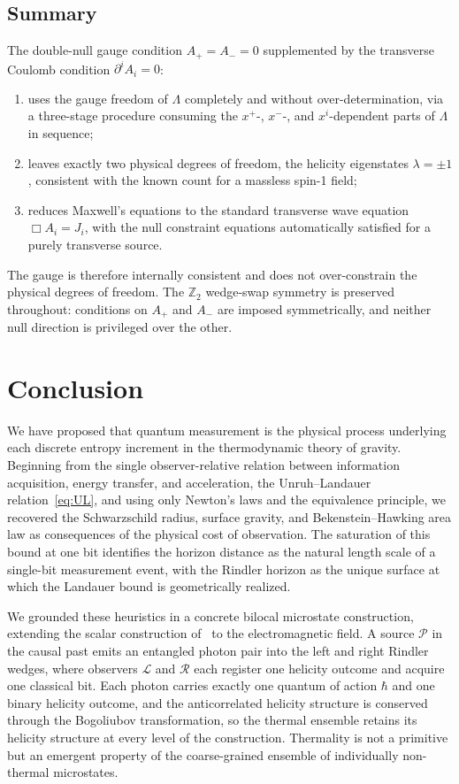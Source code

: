 \documentclass[12pt,a4paper]{article}
\begin{document}
\subsection{Summary}

The double-null gauge condition $A_+ = A_- = 0$ supplemented by the transverse 
Coulomb condition $\partial^i A_i = 0$:
\begin{enumerate}
    \item uses the gauge freedom of $\Lambda$ completely and without over-determination,
          via a three-stage procedure consuming the $x^+$-, $x^-$-, and $x^i$-dependent
          parts of $\Lambda$ in sequence;
    \item leaves exactly two physical degrees of freedom, the helicity eigenstates
          $\lambda = \pm 1$, consistent with the known count for a massless spin-1 field;
    \item reduces Maxwell's equations to the standard transverse wave equation
          $\Box A_i = J_i$, with the null constraint equations automatically satisfied
          for a purely transverse source.
\end{enumerate}
The gauge is therefore internally consistent and does not over-constrain the physical 
degrees of freedom. The $\mathbb{Z}_2$ wedge-swap symmetry is preserved throughout: 
conditions on $A_+$ and $A_-$ are imposed symmetrically, and neither null direction 
is privileged over the other.

\section{Conclusion}

We have proposed that quantum measurement is the physical process 
underlying each discrete entropy increment in the thermodynamic 
theory of gravity. Beginning from the single observer-relative 
relation between information acquisition, energy transfer, and 
acceleration, the Unruh--Landauer relation~\eqref{eq:UL}, 
and using only Newton's laws and the equivalence principle, we 
recovered the Schwarzschild radius, surface gravity, and 
Bekenstein--Hawking area law as consequences of the physical cost 
of observation. The saturation of this bound at one bit identifies 
the horizon distance as the natural length scale of a single-bit 
measurement event, with the Rindler horizon as the unique surface 
at which the Landauer bound is geometrically realized.

We grounded these heuristics in a concrete bilocal microstate 
construction, extending the scalar construction 
of~\cite{player2025driving} to the electromagnetic field. A 
source $\mathcal{P}$ in the causal past emits an entangled photon 
pair into the left and right Rindler wedges, where observers 
$\mathcal{L}$ and $\mathcal{R}$ each register one helicity 
outcome and acquire one classical bit. Each photon carries 
exactly one quantum of action $\hbar$ and one binary helicity 
outcome, and the anticorrelated helicity structure is conserved 
through the Bogoliubov transformation, so the thermal ensemble 
retains its helicity structure at every level of the 
construction. Thermality is not a primitive but an emergent 
property of the coarse-grained ensemble of individually 
non-thermal microstates.
\end{document}
